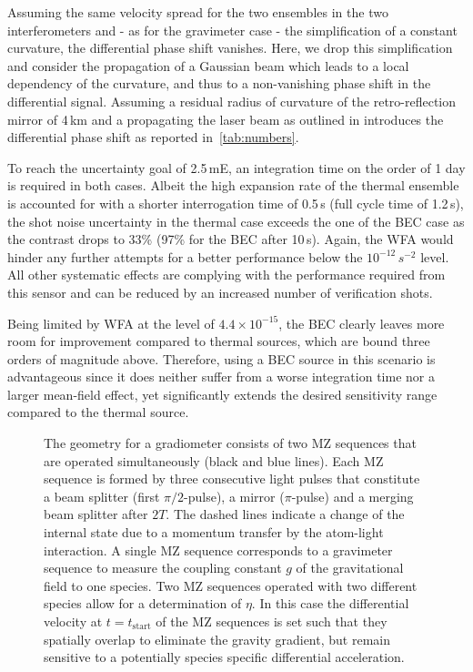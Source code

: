 Assuming the same velocity spread for the two ensembles in the two interferometers and - as for the gravimeter case - the simplification of a constant curvature, the differential phase shift vanishes. Here, we drop this simplification and consider the propagation of a Gaussian beam which leads to a local dependency of the curvature, and thus to a non-vanishing phase shift in the differential signal. Assuming a residual radius of curvature of the retro-reflection mirror of 4\,km and a propagating the laser beam as outlined in \cite{Trimeche2019} introduces the differential phase shift as reported in~\autoref{tab:numbers}.
 
To reach the uncertainty goal of 2.5\,mE, an integration time on the order of 1 day is required in both cases. Albeit the high expansion rate of the thermal ensemble is accounted for with a shorter interrogation time of 0.5\,s (full cycle time of 1.2\,s), the shot noise uncertainty in the thermal case exceeds the one of the BEC case as the contrast drops to 33\% (97\% for the BEC after 10\,s).
Again, the WFA would hinder any further attempts for a better performance below the $10^{-12}\,s^{-2}$ level. All other systematic effects are complying with the performance required from this sensor and can be reduced by an increased number of verification shots. 

Being limited by WFA at the level of $4.4\times10^{-15}$, the BEC clearly leaves more room for improvement compared to thermal sources, which are bound three orders of magnitude above. Therefore, using a BEC source in this scenario is advantageous since it does neither suffer from a worse integration time nor a larger mean-field effect, yet significantly extends the desired sensitivity range compared to the thermal source.

\begin{figure}[h!]
    \centering
    
    \caption{The geometry for a gradiometer consists of two MZ sequences that are operated simultaneously (black and blue lines). Each MZ sequence is formed by three consecutive light pulses that constitute a beam splitter (first $\pi/2$-pulse), a mirror ($\pi$-pulse) and a merging beam splitter after $2T$. The dashed lines indicate a change of the internal state due to a momentum transfer by the atom-light interaction. 
    A single MZ sequence corresponds to a gravimeter sequence to measure the coupling constant $g$ of the gravitational field to one species.
    Two MZ sequences operated with two different species allow for a determination of $\eta$. In this case the differential velocity at $t=t_\text{start}$ of the MZ sequences is set such that they spatially overlap to eliminate the gravity gradient, but remain sensitive to a potentially species specific differential acceleration.}
    \label{fig:AI-geometry-scheme}
\end{figure}
%
